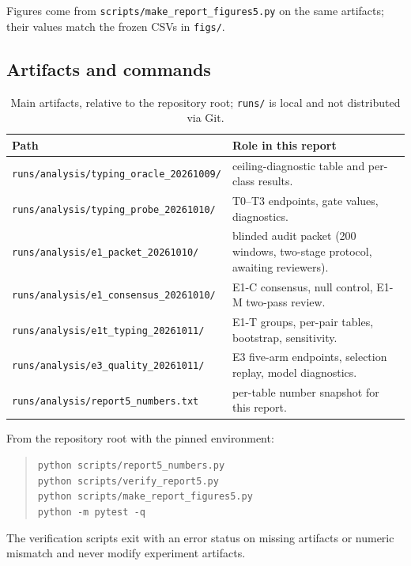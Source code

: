 \documentclass[11pt,a4paper]{article}
\newcommand{\code}[1]{\nolinkurl{#1}}
\begin{document}
Figures come from \code{scripts/make\_report\_figures5.py} on the same artifacts; their values match the frozen CSVs in \code{figs/}.

\subsection{Artifacts and commands}

\begin{table}[H]
\centering\footnotesize
\caption{Main artifacts, relative to the repository root; \code{runs/} is local and not distributed via Git.}
\begin{tabularx}{\linewidth}{lY}\toprule
Path & Role in this report\\\midrule
\code{runs/analysis/typing\_oracle\_20261009/} & ceiling-diagnostic table and per-class results.\\
\code{runs/analysis/typing\_probe\_20261010/} & T0--T3 endpoints, gate values, diagnostics.\\
\code{runs/analysis/e1\_packet\_20261010/} & blinded audit packet (200 windows, two-stage protocol, awaiting reviewers).\\
\code{runs/analysis/e1\_consensus\_20261010/} & E1-C consensus, null control, E1-M two-pass review.\\
\code{runs/analysis/e1t\_typing\_20261011/} & E1-T groups, per-pair tables, bootstrap, sensitivity.\\
\code{runs/analysis/e3\_quality\_20261011/} & E3 five-arm endpoints, selection replay, model diagnostics.\\
\code{runs/analysis/report5\_numbers.txt} & per-table number snapshot for this report.\\\bottomrule
\end{tabularx}
\end{table}

From the repository root with the pinned environment:
\begin{quote}\small
\texttt{python scripts/report5\_numbers.py}\\
\texttt{python scripts/verify\_report5.py}\\
\texttt{python scripts/make\_report\_figures5.py}\\
\texttt{python -m pytest -q}
\end{quote}
The verification scripts exit with an error status on missing artifacts or numeric mismatch and never modify experiment artifacts.
\end{document}
